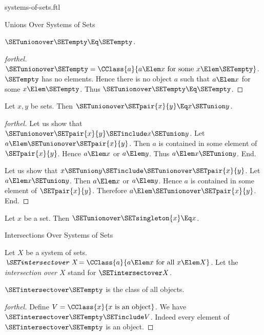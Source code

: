 \documentclass{stex}
\begin{document}
\begin{smodule}{systems-of-sets.ftl}
\begin{sfragment}{Unions Over Systems of Sets}
  \begin{proposition}[forthel]
    $\SETunionover \SETempty \Eq \SETempty$.
  \end{proposition}
  \begin{proof}[forthel]
    $\SETunionover \SETempty = \CClass{a}{a \Elem x\text{ for some }x \Elem \SETempty}$.
    $\SETempty$ has no elements.
    Hence there is no object $a$ such that $a \Elem x$ for some $x \Elem \SETempty$.
    Thus $\SETunionover \SETempty \Eq \SETempty$.
  \end{proof}

  \begin{proposition}[forthel]
    Let $x, y$ be sets.
    Then $\SETunionover \SETpair{x}{y} \Eq x \SETunion y$.
  \end{proposition}
  \begin{proof}[forthel]
    Let us show that $\SETunionover \SETpair{x}{y} \SETinclude x \SETunion y$.
      Let $a \Elem \SETunionover \SETpair{x}{y}$.
      Then $a$ is contained in some element of $\SETpair{x}{y}$.
      Hence $a \Elem x$ or $a \Elem y$.
      Thus $a \Elem x \SETunion y$.
    End.

    Let us show that $x \SETunion y \SETinclude \SETunionover \SETpair{x}{y}$.
      Let $a \Elem x \SETunion y$.
      Then $a \Elem x$ or $a \Elem y$.
      Hence $a$ is contained in some element of $\SETpair{x}{y}$.
      Therefore $a \Elem \SETunionover \SETpair{x}{y}$.
    End.
  \end{proof}

  \begin{corollary}[forthel]
    Let $x$ be a set.
    Then $\SETunionover \SETsingleton{x} \Eq x$.
  \end{corollary}
\end{sfragment}

\begin{sfragment}{Intersections Over Systems of Sets}
  \begin{definition}[forthel]
    Let $X$ be a system of sets.
    $\emph{\SETintersectover X} = \CClass{a}{a \Elem x\text{ for all }x \Elem X}$.
    Let the \emph{intersection over $X$} stand for $\SETintersectover X$.
  \end{definition}

  \begin{proposition}[forthel]
    $\SETintersectover \SETempty$ is the class of all objects.
  \end{proposition}
  \begin{proof}[forthel]
    Define $V = \CClass{x}{x\text{ is an object}}$.
    We have $\SETintersectover \SETempty \SETinclude V$.
    Indeed every element of $\SETintersectover \SETempty$ is an object.


\end{proof}
\end{sfragment}
\end{smodule}
\end{document}
